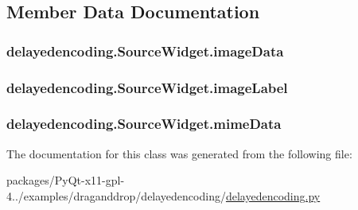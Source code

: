 \subsection{Member Data Documentation}
\hypertarget{classdelayedencoding_1_1SourceWidget_a844ab2a9d080694591daa7e885927fcb}{}
\subsubsection[{image\+Data}]{\setlength{\rightskip}{0pt plus 5cm}delayedencoding.\+Source\+Widget.\+image\+Data}\label{classdelayedencoding_1_1SourceWidget_a844ab2a9d080694591daa7e885927fcb}
\hypertarget{classdelayedencoding_1_1SourceWidget_ad28b6abf1cac69caecc42e7c08e993c3}{}
\subsubsection[{image\+Label}]{\setlength{\rightskip}{0pt plus 5cm}delayedencoding.\+Source\+Widget.\+image\+Label}\label{classdelayedencoding_1_1SourceWidget_ad28b6abf1cac69caecc42e7c08e993c3}
\hypertarget{classdelayedencoding_1_1SourceWidget_a00e4b17fb089d0093e1f4602414bc269}{}
\subsubsection[{mime\+Data}]{\setlength{\rightskip}{0pt plus 5cm}delayedencoding.\+Source\+Widget.\+mime\+Data}\label{classdelayedencoding_1_1SourceWidget_a00e4b17fb089d0093e1f4602414bc269}


The documentation for this class was generated from the following file\+:\begin{DoxyCompactItemize}
\item 
packages/\+Py\+Qt-\/x11-\/gpl-\/4../examples/draganddrop/delayedencoding/\hyperlink{delayedencoding_8py}{delayedencoding.\+py}\end{DoxyCompactItemize}
